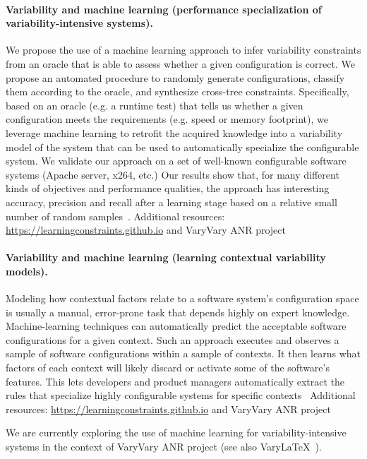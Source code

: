 \paragraph{Variability and machine learning (performance specialization of variability-intensive systems).}
	We propose the use of a machine learning approach to infer variability constraints
	from an oracle that is able to assess whether a given configuration is correct.
	We propose an automated procedure to randomly generate configurations, classify them according to the oracle, and synthesize cross-tree constraints. Specifically, based on an oracle (e.g. a runtime test) that tells us whether a given configuration meets the requirements (e.g. speed or memory footprint), we leverage machine learning to retrofit the acquired knowledge into a variability model of the system that can be used to automatically specialize the configurable system. We validate our approach on a set of well-known configurable software systems (Apache server, x264, etc.) 
    Our results show that, for many different kinds of objectives and performance qualities, the approach has interesting accuracy, precision and recall after a learning stage based on a relative small number of random samples~\cite{temple:hal-01467299}.    
    Additional resources: \url{https://learningconstraints.github.io} and VaryVary ANR project
    
\paragraph{Variability and machine learning (learning contextual variability models).} 
Modeling how contextual factors relate to a software system’s configuration space is usually a manual, error-prone task that depends highly on expert knowledge. Machine-learning techniques can automatically predict the acceptable software configurations for a given context. Such an approach executes and observes a sample of software configurations within a sample of contexts. It then learns what factors of each context will likely discard or activate some of the software’s features. This lets developers and product managers automatically extract the rules that specialize highly configurable systems for specific contexts~\cite{temple:hal-01659137}
Additional resources: \url{https://learningconstraints.github.io} and VaryVary ANR project

We are currently exploring the use of machine learning for variability-intensive systems in the context of VaryVary ANR project (see also VaryLaTeX~\cite{acher:hal-01659161}).



